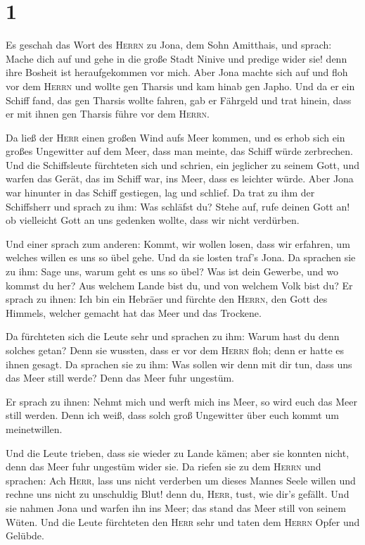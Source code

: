 \hypertarget{section}{%
\section{1}\label{section}}

 Es geschah das Wort des \textsc{Herrn} zu Jona, dem Sohn
Amitthais, und sprach:  Mache dich auf und gehe in die
große Stadt Ninive und predige wider sie! denn ihre Bosheit ist
heraufgekommen vor mich.  Aber Jona machte sich auf und
floh vor dem \textsc{Herrn} und wollte gen Tharsis und kam hinab gen
Japho. Und da er ein Schiff fand, das gen Tharsis wollte fahren, gab er
Fährgeld und trat hinein, dass er mit ihnen gen Tharsis führe vor dem
\textsc{Herrn}.

 Da ließ der \textsc{Herr} einen großen Wind aufs Meer
kommen, und es erhob sich ein großes Ungewitter auf dem Meer, dass man
meinte, das Schiff würde zerbrechen.  Und die Schiffsleute
fürchteten sich und schrien, ein jeglicher zu seinem Gott, und warfen
das Gerät, das im Schiff war, ins Meer, dass es leichter würde. Aber
Jona war hinunter in das Schiff gestiegen, lag und schlief.
 Da trat zu ihm der Schiffsherr und sprach zu ihm: Was
schläfst du? Stehe auf, rufe deinen Gott an! ob vielleicht Gott an uns
gedenken wollte, dass wir nicht verdürben.

 Und einer sprach zum anderen: Kommt, wir wollen losen,
dass wir erfahren, um welches willen es uns so übel gehe. Und da sie
losten traf's Jona.  Da sprachen sie zu ihm: Sage uns,
warum geht es uns so übel? Was ist dein Gewerbe, und wo kommst du her?
Aus welchem Lande bist du, und von welchem Volk bist du? 
Er sprach zu ihnen: Ich bin ein Hebräer und fürchte den \textsc{Herrn},
den Gott des Himmels, welcher gemacht hat das Meer und das Trockene.

 Da fürchteten sich die Leute sehr und sprachen zu ihm:
Warum hast du denn solches getan? Denn sie wussten, dass er vor dem
\textsc{Herrn} floh; denn er hatte es ihnen gesagt.  Da
sprachen sie zu ihm: Was sollen wir denn mit dir tun, dass uns das Meer
still werde? Denn das Meer fuhr ungestüm.

 Er sprach zu ihnen: Nehmt mich und werft mich ins Meer,
so wird euch das Meer still werden. Denn ich weiß, dass solch groß
Ungewitter über euch kommt um meinetwillen.

 Und die Leute trieben, dass sie wieder zu Lande kämen;
aber sie konnten nicht, denn das Meer fuhr ungestüm wider sie.
 Da riefen sie zu dem \textsc{Herrn} und sprachen: Ach
\textsc{Herr}, lass uns nicht verderben um dieses Mannes Seele willen
und rechne uns nicht zu unschuldig Blut! denn du, \textsc{Herr}, tust,
wie dir's gefällt.  Und sie nahmen Jona und warfen ihn
ins Meer; das stand das Meer still von seinem Wüten.  Und
die Leute fürchteten den \textsc{Herr} sehr und taten dem \textsc{Herrn}
Opfer und Gelübde.

